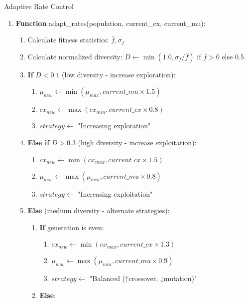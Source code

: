 \documentclass[12pt,a4paper]{article}
\begin{document}
\begin{algorithm}
\caption{Adaptive Rate Control}
\begin{enumerate}
    \item \textbf{Function} adapt\_rates(population, current\_cx, current\_mu):
    \begin{enumerate}
        \item Calculate fitness statistics: $\bar{f}, \sigma_f$
        \item Calculate normalized diversity: $D \leftarrow \min(1.0, \sigma_f / \bar{f})$ if $\bar{f} > 0$ else 0.5
        \item \textbf{If} $D < 0.1$ (low diversity - increase exploration):
        \begin{enumerate}
            \item $\mu_{new} \leftarrow \min(\mu_{max}, current\_mu \times 1.5)$
            \item $cx_{new} \leftarrow \max(cx_{min}, current\_cx \times 0.8)$
            \item $strategy \leftarrow$ "Increasing exploration"
        \end{enumerate}
        \item \textbf{Else if} $D > 0.3$ (high diversity - increase exploitation):
        \begin{enumerate}
            \item $cx_{new} \leftarrow \min(cx_{max}, current\_cx \times 1.5)$
            \item $\mu_{new} \leftarrow \max(\mu_{min}, current\_mu \times 0.8)$
            \item $strategy \leftarrow$ "Increasing exploitation"
        \end{enumerate}
        \item \textbf{Else} (medium diversity - alternate strategies):
        \begin{enumerate}
            \item \textbf{If} generation is even:
            \begin{enumerate}
                \item $cx_{new} \leftarrow \min(cx_{max}, current\_cx \times 1.3)$
                \item $\mu_{new} \leftarrow \max(\mu_{min}, current\_mu \times 0.9)$
                \item $strategy \leftarrow$ "Balanced (↑crossover, ↓mutation)"
            \end{enumerate}
            \item \textbf{Else}:

\end{enumerate}
\end{enumerate}
\end{enumerate}
\end{algorithm}
\end{document}
